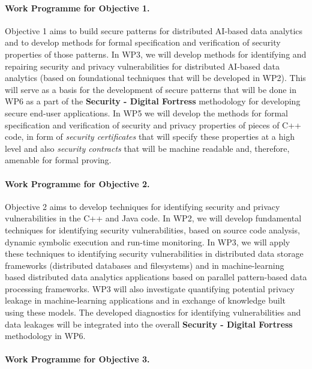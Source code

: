 \documentclass[a4paper,11pt]{article}
\newcommand{\project}[1]{\textbf{#1}\xspace}
\newcommand{\SECURITY}{\project{Security - Digital Fortress}}
\newcommand{\TheProject}{\SECURITY}
\begin{document}
\paragraph*{Work Programme for Objective 1.}

Objective 1 aims to build secure patterns for distributed AI-based data analytics and to develop methods for formal specification and verification of security properties of those patterns. In WP3, we will develop methods for identifying and repairing security and privacy vulnerabilities for distributed AI-based data analytics (based on foundational techniques that will be developed in WP2). This will serve as a basis for the development of secure patterns that will be done in WP6 as a part of the \TheProject{} methodology for developing secure end-user applications. In WP5 we will develop the methods for formal specification and verification of security and privacy properties of pieces of C++ code, in form of \emph{security certificates} that will specify these properties at a high level and also \emph{security contracts} that will be machine readable and, therefore, amenable for formal proving. 

\paragraph*{Work Programme for Objective 2.}

Objective 2 aims to develop techniques for identifying security and privacy vulnerabilities in the C++ and Java code. In WP2, we will develop fundamental techniques for identifying security vulnerabilities, based on source code analysis, dynamic symbolic execution and run-time monitoring. In WP3, we will apply these techniques to identifying security vulnerabilities in distributed data storage frameworks (distributed databases and filesystems) and in machine-learning based distributed data analytics applications based on parallel pattern-based data processing frameworks. WP3 will also investigate quantifying potential privacy leakage in machine-learning applications and in exchange of knowledge built using these models. The developed diagnostics for identifying vulnerabilities and data leakages will be integrated into the overall \TheProject{} methodology in WP6.

\paragraph{Work Programme for Objective 3.}
\end{document}
